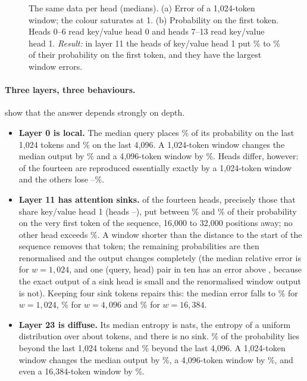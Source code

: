 \begin{figure}[t]
\centering
{}
\caption{The same data per head (medians). (a) Error of a 1{,}024-token window; the
colour saturates at 1. (b) Probability on the first token. Heads 0--6 read
key/value head 0 and heads 7--13 read key/value head 1. \emph{Result:} in layer 11
the  heads of key/value head 1 put
\% to \% of their probability on the
first token, and they have the largest window errors.}
\label{fig:realheads}
\end{figure}

\paragraph{Three layers, three behaviours.}
 show that the answer depends strongly on depth.
\begin{itemize}
\item \textbf{Layer 0 is local.} The median query places \% of
its probability on the last 1{,}024 tokens and \% on the last
4{,}096. A 1{,}024-token window changes the median output by
\% and a 4{,}096-token window by
\%. Heads differ, however:  of the
fourteen are reproduced essentially exactly by a 1{,}024-token window and the others
lose --\%.
\item \textbf{Layer 11 has attention sinks.}  of the fourteen
heads, precisely those that share key/value head 1 (heads
--), put between \%
and \% of their probability on the very first token of the
sequence, 16{,}000 to 32{,}000 positions away; no other head exceeds
\%. A window shorter than the distance to the start of the sequence removes that
token; the remaining probabilities are then renormalised and the output changes
completely (the median
relative error is  for $w=1{,}024$, and one (query, head)
pair in ten has an error above , because the exact
output of a sink head is small and the renormalised window output is not). Keeping
four sink tokens repairs this: the median error falls to
\% for $w=1{,}024$, \% for
$w=4{,}096$ and \% for $w=16{,}384$.
\item \textbf{Layer 23 is diffuse.} Its median entropy is 
nats, the entropy of a uniform distribution over about 
tokens, and there is no sink. \% of the probability lies
beyond the last 1{,}024 tokens and \% beyond the last
4{,}096. A 1{,}024-token window changes the median output by
\%, a 4{,}096-token window by \%,
and even a 16{,}384-token window by \%.
\end{itemize}

